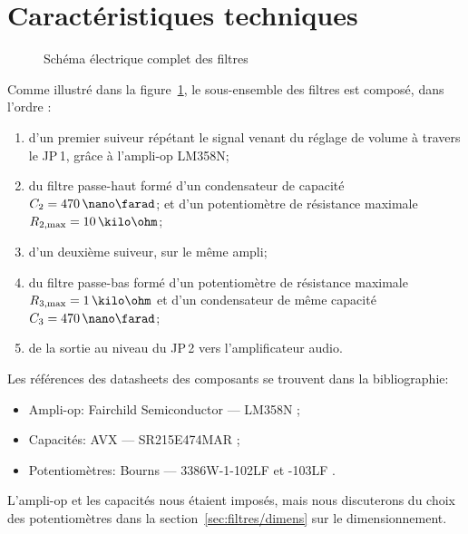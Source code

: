 \section{Caractéristiques techniques}
\label{sec:filtres/car-tech}

\begin{figure}[h!]
 \centering
  \caption{Schéma électrique complet des filtres}
  \label{fig:schema-elec-filtres}
\end{figure}

Comme illustré dans la figure~\ref{fig:schema-elec-filtres},
le sous-ensemble des filtres est composé, dans l'ordre :
\begin{enumerate}
    \item d'un premier suiveur répétant le signal venant du réglage de volume
        à travers le JP\,1, grâce à l'ampli-op LM358N;
    \item du filtre passe-haut formé d'un
        condensateur de capacité $C_2 = 470\,\nano\farad$;
        et d'un potentiomètre de résistance
        maximale $R\ind{2,max} = 10\,\kilo\ohm$;
    \item d'un deuxième suiveur, sur le même ampli;
    \item du filtre passe-bas formé d'un potentiomètre de résistance
        maximale $R\ind{3,max} = 1\,\kilo\ohm$
        et d'un condensateur de même capacité $C_3 = 470\,\nano\farad$;
    \item de la sortie au niveau du JP\,2 vers l'amplificateur audio.
\end{enumerate}

Les références des datasheets des composants se trouvent dans la bibliographie:
\begin{itemize}
    \item Ampli-op: Fairchild Semiconductor --- LM358N \cite{datasheet-lm358n};
    \item Capacités: AVX --- SR215E474MAR \cite{datasheet-470nf};
    \item Potentiomètres: Bourns --- 3386W-1-102LF et -103LF \cite{datasheet-pot}.
\end{itemize}

L'ampli-op et les capacités nous étaient imposés,
mais nous discuterons du choix des potentiomètres dans
la section~\ref{sec:filtres/dimens} sur le dimensionnement.
